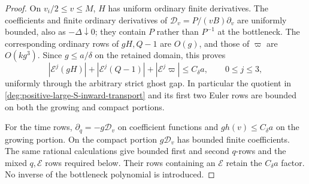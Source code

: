 \begin{proof}
On \(v_i/2\le v\le M\), \(H\) has uniform ordinary finite
derivatives. The coefficients and finite ordinary derivatives of
\({\mathcal D}_v=P/(vB)\partial_v\) are uniformly bounded, also as
\(-\Delta\downarrow0\); they contain \(P\) rather than \(P^{-1}\)
at the bottleneck. The corresponding ordinary rows of \(gH,Q-1\)
are \(O(g)\), and those of \(\varpi\) are \(O(kg^3)\).
Since \(g\le a/\delta\) on the retained domain, this proves
\begin{equation}\label{deg:positive-large-S-inward-coefficient-Euler}
 |{\mathcal E}^j(gH)|+|{\mathcal E}^j(Q-1)|+|{\mathcal E}^j\varpi|
      \le C_\delta a,\qquad 0\le j\le3,
\end{equation}
uniformly through the arbitrary strict ghost gap.
In particular the quotient in \eqref{deg:positive-large-S-inward-transport} and its first
two Euler rows are bounded on both the growing and compact portions.

For the time rows, \(\partial_q=-g{\mathcal D}_v\) on coefficient
functions and \(gh(v)\le C_\delta a\) on the growing portion.
On the compact portion \(g{\mathcal D}_v\) has bounded finite coefficients.
The same rational calculations give bounded first and second
\(q\)-rows and the mixed \(q,{\mathcal E}\) rows required below.
Their rows containing an \({\mathcal E}\) retain the \(C_\delta a\) factor.
No inverse of the bottleneck polynomial is introduced.


\end{proof}
